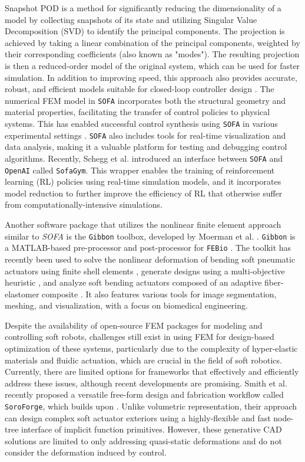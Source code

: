 Snapshot POD \cite{Benner2014,Astrid2008} is a method for significantly reducing the dimensionality of a model by collecting snapshots of its state and utilizing Singular Value Decomposition (SVD) to identify the principal components. The projection is achieved by taking a linear combination of the principal components, weighted by their corresponding coefficients (also known as "modes"). The resulting projection is then a reduced-order model of the original system, which can be used for faster simulation. In addition to improving speed, this approach also provides accurate, robust, and efficient models suitable for closed-loop controller design \cite{Thieffry2019,Wu2021,Alora2022,Tonkens2020}. The numerical FEM model in \texttt{SOFA} incorporates both the structural geometry and material properties, facilitating the transfer of control policies to physical systems. This has enabled successful control synthesis using \texttt{SOFA} in various experimental settings \cite{Wu2021Feb, Katzschmann2019Apr}. \texttt{SOFA} also includes tools for real-time visualization and data analysis, making it a valuable platform for testing and debugging control algorithms. Recently, Schegg et al. \cite{Schegg2022} introduced an interface between \texttt{SOFA} and \texttt{OpenAI} called \texttt{SofaGym}. This wrapper enables the training of reinforcement learning (RL) policies using real-time simulation models, and it incorporates model reduction to further improve the efficiency of RL that otherwise suffer from computationally-intensive simulations.

Another software package that utilizes the nonlinear finite element approach similar to \textit{SOFA} is the \texttt{Gibbon} toolbox, developed by Moerman et al. \cite{Moerman2018}. \texttt{Gibbon} is a MATLAB-based pre-processor and post-processor for \texttt{FEBio} \cite{Maas2012}. The toolkit has recently been used to solve the nonlinear deformation of bending soft pneumatic actuators using finite shell elements \cite{Smith2022_FEM}, generate designs using a multi-objective heuristic \cite{Smith2022}, and analyze soft bending actuators composed of an adaptive fiber-elastomer composite \cite{Kamble2022Jan}. It also features various tools for image segmentation, meshing, and visualization, with a focus on biomedical engineering.

Despite the availability of open-source FEM packages for modeling and controlling soft robots, challenges still exist in using FEM for design-based optimization of these systems, particularly due to the complexity of hyper-elastic materials and fluidic actuation, which are crucial in the field of soft robotics. Currently, there are limited options for frameworks that effectively and efficiently address these issues, although recent developments are promising. Smith et al. \cite{Smith2023Feb} recently proposed a versatile free-form design and fabrication workflow called \texttt{SoroForge}, which builds upon \cite{Smith2022_FEM,Smith2022}. Unlike volumetric representation, their approach can design complex soft actuator exteriors using a highly-flexible and fast node-tree interface of implicit function primitives. However, these generative CAD solutions are limited to only addressing quasi-static deformations and do not consider the deformation induced by control.

